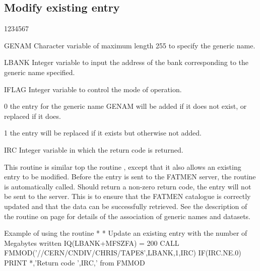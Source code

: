 \subsection{Modify existing entry}
\begin{DLtt}{1234567}
\item[GENAM]
Character variable of maximum length 255 to specify the generic name.
\item[LBANK]
Integer variable to input the address of the bank corresponding
to the generic name specified.
\item[IFLAG]
Integer variable to control the mode of operation.
\begin{DLtt}{12}
\item[0]the entry for the generic name GENAM will
be added if it does not exist, or replaced if it does.
\item[1]the entry will be replaced if it exists
but otherwise not added.
\end{DLtt}
\item[IRC]
Integer variable in which the return code is returned.
\end{DLtt}
\par
This routine is similar top the routine , except
that it also allows an existing entry to be modified.
Before the entry is sent to the FATMEN server, the routine 
is automatically called. Should  return a non-zero return
code, the entry will not be sent to the server. This is to ensure
that the FATMEN catalogue is correctly updated and that the data
can be successfully retrieved.
See the description of the  routine on 
page \pageref{FMCOMP} for details of the association
of generic names and datasets.
\begin{XMPt}{Example of using the \protect{} routine}
*
*     Update an existing entry with the number of Megabytes written
      IQ(LBANK+MFSZFA) = 200
      CALL FMMOD('//CERN/CNDIV/CHRIS/TAPE8',LBANK,1,IRC)
      IF(IRC.NE.0) PRINT *,'Return code ',IRC,' from FMMOD
\end{XMPt}
